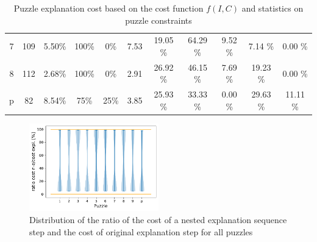 \begin{table}
\begin{tabular}{c|cc|cc|c|ccccc}
		7          & 109                & 5.50\%             & 100\%                                              & 0\%                   & 7.53                                                                   & 19.05 \%      & 64.29 \%        & 9.52 \%       & 7.14 \%            & 0.00 \%      \\
		8          & 112                & 2.68\%             & 100\%                                              & 0\%                   & 2.91                                                                   & 26.92 \%      & 46.15 \%        & 7.69 \%       & 19.23 \%           & 0.00 \%      \\
		p          & 82                 & 8.54\%             & 75\%                                               & 25\%                  & 3.85                                                                   & 25.93 \%      & 33.33 \%        & 0.00 \%       & 29.63 \%           & 11.11 \%
	\end{tabular}
	\caption{Puzzle explanation cost based on the cost function $f(I, C)$ and statistics on puzzle constraints}
	\label{table:nested_explanation}
\end{table}


\begin{figure}[]
	\centering
	\includegraphics[width=0.5\textwidth]{figures/violin_plot.pdf}
	\caption{Distribution of the ratio of the cost of a nested explanation sequence step and the cost of original explanation step for all puzzles}
	\label{fig:experiments:violin}
\end{figure}